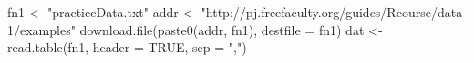 \begin{Schunk}
\begin{Sinput}
  fn1 <- "practiceData.txt"
  addr <- "http://pj.freefaculty.org/guides/Rcourse/data-1/examples"
  download.file(paste0(addr, fn1), destfile = fn1)
  dat <- read.table(fn1, header = TRUE, sep = ",")
\end{Sinput}
\end{Schunk}
